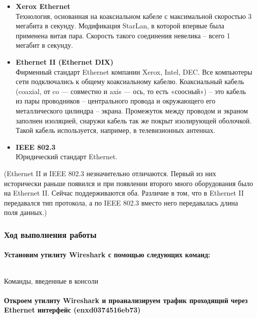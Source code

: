 \begin{itemize}
    \item \textbf{Xerox Ethernet}\\
Технология, основанная на коаксиальном кабеле с максимальной скоростью 3 мегабита в секунду. Модификация StarLan, в которой впервые была применена витая пара. Скорость такого соединения невелика – всего 1 мегабит в секунду.
    
    \item \textbf{Ethernet II (Ethernet DIX)}\\ 
Фирменный стандарт Ethernet компании Xerox, Intel, DEC. Все компьютеры сети подключались к общему коаксиальному кабелю. Коаксиальный кабель (coaxial, от co — совместно и axis — ось, то есть «соосный») – это кабель из пары проводников – центрального провода и окружающего его металлического цилиндра – экрана. Промежуток между проводом и экраном заполнен изоляцией, снаружи кабель так же покрыт изолирующей оболочкой. Такой кабель используется, например, в телевизионных антеннах.
    
    \item \textbf{IEEE 802.3}\\ 
    Юридический стандарт Ethernet. 
\end{itemize}    
\noindent(Ethernet II и IEEE 802.3 незначительно отличаются. Первый из них исторически раньше появился и при появлении второго много оборудования было на Ethernet II. Сейчас поддерживаются оба. Различие в том, что в Ethernet II передавался тип протокола, а по IEEE 802.3 вместо него передавалась длина поля данных.)

\newpage

\subsubsection{Ход выполнения работы}

\paragraph{Установим утилиту Wireshark с помощью следующих команд:}

\begin{code}
	\inputminted[breaklines=true, xleftmargin=1em, linenos, frame=single, framesep=10pt, fontsize=\footnotesize, firstline=1, lastline=33]{haskell}{fig/wireshark.bash}
	\caption{Команды, введенные в консоли}
\end{code}

\paragraph{Откроем утилиту Wireshark и проанализируем трафик проходящий через Ethernet интерфейс (enxd0374516eb73)}

